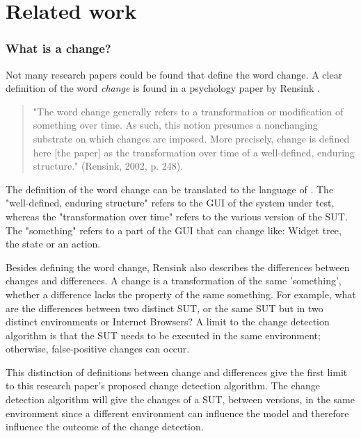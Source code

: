 \chapter{Related work}


\subsection{What is a change?} \label{sec:what-is-change}

Not many research papers could be found that define the word change. A clear definition of the word \textit{change} is found in a psychology paper by Rensink \cite{rensink2002change}.

\begin{quote}
    "The word change generally refers to a transformation or modification of something over time. As such, this notion presumes a nonchanging substrate on which changes are imposed. More precisely, change is defined here [the paper] as the transformation over time of a well-defined, enduring structure." (Rensink, 2002, p. 248).
\end{quote}

The definition of the word change can be translated to the language of \testar. The "well-defined, enduring structure" refers to the GUI of the system under test, whereas the "transformation over time" refers to the various version of the SUT. The "something" refers to a part of the GUI that can change like: Widget tree, the state or an action. 

Besides defining the word change, Rensink also describes the differences between changes and differences. A change is a transformation of the same 'something', whether a difference lacks the property of the same something. For example, what are the differences between two distinct SUT, or the same SUT but in two distinct environments or Internet Browsers? A limit to the change detection algorithm is that the SUT needs to be executed in the same environment; otherwise, false-positive changes can occur.

This distinction of definitions between change and differences give the first limit to this research paper's proposed change detection algorithm. The change detection algorithm will give the changes of a SUT, between versions, in the same environment since a different environment can influence the model and therefore influence the outcome of the change detection.


